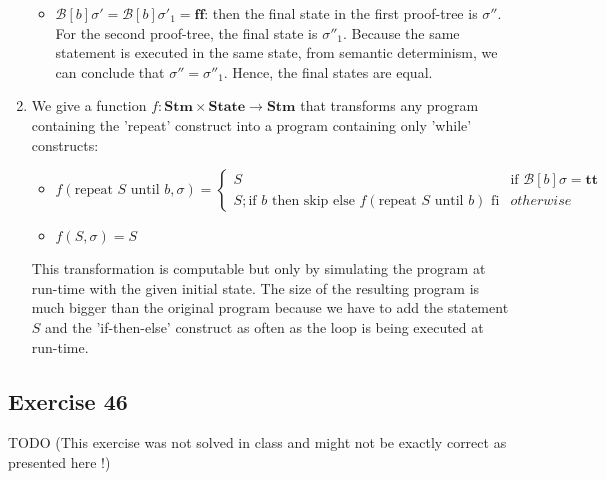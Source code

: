 \documentclass[12pt,fleqn]{article}		%
\begin{document}
\begin{enumerate}
\begin{itemize}
\item $ \mathcal{B}[b]\sigma' = \mathcal{B}[b]\sigma'_1 = \textbf{ff}$: then the final state in the first proof-tree is $\sigma''$. For the second proof-tree, the final state is $\sigma''_1$. Because the same statement is executed in the same state, from semantic determinism, we can conclude that $\sigma'' = \sigma''_1$. Hence, the final states are equal.
\end{itemize}
\item We give a function $ f : \textbf{Stm} \times \textbf{State} \rightarrow \textbf{Stm} $ that transforms any program containing the 'repeat' construct into a program containing only 'while' constructs:\\
\begin{itemize}
\item $f(\text{repeat } S \text{ until } b, \sigma) = \begin{cases}
S & \text{if } \mathcal{B}[b]\sigma = \textbf{tt}\\
S; \text{if } b \text{ then skip else } f(\text{repeat } S \text{ until } b) \text{ fi} & otherwise
\end{cases}$
\item $f(S, \sigma) = S$
\end{itemize}
This transformation is computable but only by simulating the program at run-time with the given initial state. The size of the resulting program is much bigger than the original program because we have to add the statement $S$ and the 'if-then-else' construct as often as the loop is being executed at run-time.
\end{enumerate}

\subsection{Exercise 46}
TODO (This exercise was not solved in class and might not be exactly correct as presented here !)
\end{document}
